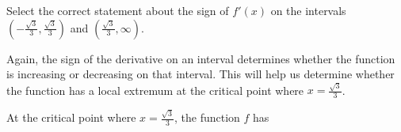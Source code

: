 \documentclass{ximera}
\begin{document}
\begin{example}
\begin{explanation}
\begin{question}
  \begin{multipleChoice}
           \end{multipleChoice}
  \end{question}
  \begin{question}
Select the correct  statement about the sign of $f'(x)$ on the intervals  $\left(-\frac{\sqrt{3}}{3},\frac{\sqrt{3}}{3}\right)$ and  $\left(\frac{\sqrt{3}}{3},\infty\right)$. \\
 
  \begin{multipleChoice}
  \end{multipleChoice}
  \end{question}
Again, the sign of the derivative on an interval determines whether the function is increasing or decreasing on that interval. This will help us determine whether the function has a local extremum at the critical point  where $x=\frac{\sqrt{3}}{3}$. \\
  \begin{question}

At the critical point where $x=\frac{\sqrt{3}}{3}$, the function $f$ has  \\
 

\end{question}
\end{explanation}
\end{example}
\end{document}
